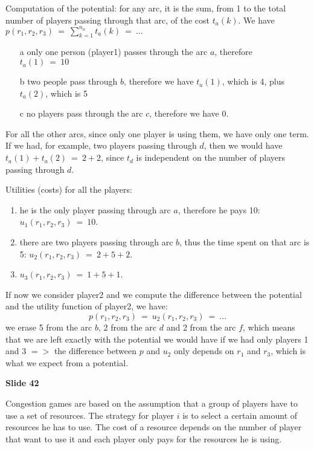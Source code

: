 \noindent Computation of the potential: for any arc, it is the sum, 
from 1 to the total number of players passing through that arc, of the 
cost $t_a(k)$. We have $p(r_1,r_2,r_3)~=~\sum_{k=1}^{n_a}{t_a(k)~=~...}$
\begin{enumerate}
	\item[a] only one person (player1) passes through the arc $a$, 
		therefore\\ $t_a(1)~=~10$
	\item[b] two people pass through $b$, therefore we have $t_a(1)$, 
		which is 4, plus $t_a(2)$, which is 5
	\item[c] no players pass through the arc $c$, therefore we have 0.
\end{enumerate}

\noindent For all the other arcs, since only one player is using them, we 
have only one term. If we had, for example, two players passing through 
$d$, then we would have $t_a(1)+t_a(2)~=~2+2$, since $t_d$ is independent 
on the number of players passing through $d$.

\noindent Utilities (costs) for all the players:
\begin{enumerate}
	\item he is the only player passing through arc $a$, therefore he 
		pays 10:\\ $u_1(r_1,r_2,r_3)~=~10$.
	\item there are two players passing through arc $b$, thus the time 
		spent on that arc is 5: $u_2(r_1,r_2,r_3)~=~2+5+2$.
	\item $u_3(r_1,r_2,r_3)~=~1+5+1$.
\end{enumerate}

\noindent If now we consider player2 and we compute the difference between 
the potential and the utility function of player2, we have: 
\[
	p(r_1,r_2,r_3)~=~u_2(r_1,r_2,r_3)~=~...
\]
we erase 5 from the arc $b$, 2 from the arc $d$ and 2 from the arc $f$, which 
means that we are left exactly with the potential we would have if we had 
only players 1 and 3 $=>$ the difference between $p$ and $u_2$ only depends 
on $r_1$ and $r_3$, which is what we expect from a potential.

\bigskip
\noindent \textbf{Slide 42}

\noindent Congestion games are based on the assumption that a group of 
players have to use a set of resources. The strategy for player $i$ is to 
select a certain amount of resources he has to use. The cost of a resource 
depends on the number of player that want to use it and each player only 
pays for the resources he is using.

